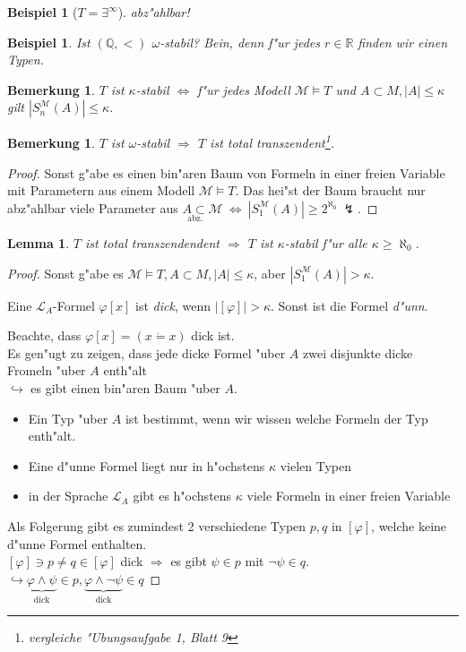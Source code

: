 \documentclass[a4paper,12pt,numbers=noenddot,parskip=full]{scrartcl}
\newcommand{\setQ}{\mathbb{Q}}
\newcommand{\setR}{\mathbb{R}}
\newcommand{\scrL}{\mathcal{L}}
\newcommand{\scrM}{\mathcal{M}}
\theoremstyle{dotless}
\newtheorem{lemma}[theorem]{Lemma}
\newtheorem{example}[theorem]{Beispiel}
\newtheorem{remark}[theorem]{Bemerkung}
\begin{document}
\begin{example}[$T = \exists^\infty$]
	abz"ahlbar!
\end{example}
\begin{example}
	Ist $(\setQ, <)$ $\omega$-stabil? Bein, denn f"ur jedes $r \in \setR$ finden wir einen Typen.
\end{example}
\begin{remark}
	$T$ ist $\kappa$-stabil $\Longleftrightarrow$ f"ur jedes Modell $\scrM \models T$ und $A \subset M, |A| \leq \kappa$ gilt $|S_n^\scrM(A)| \leq \kappa$.
\end{remark}
\begin{remark}
	$T$ ist $\omega$-stabil $\Longrightarrow$ $T$ ist total transzendent\footnote{vergleiche "Ubungsaufgabe 1, Blatt 9}.
\end{remark}
\begin{proof}
	Sonst g"abe es einen bin"aren Baum von Formeln in einer freien Variable mit Parametern aus einem Modell $\scrM \models T$. Das hei"st der Baum braucht nur abz"ahlbar viele Parameter aus $\underset{\text{abz.}}{A \subset} \scrM~ \Leftrightarrow~ |S_1^\scrM (A)| \geq 2^{\aleph_0}~ \lightning$.
\end{proof}
\begin{lemma}
	$T$ ist total transzendendent $\Rightarrow$ $T$ ist $\kappa$-stabil f"ur alle $\kappa \geq \aleph_0$.
\end{lemma}
\begin{proof}
	Sonst g"abe es $\scrM \models T, A\subset M, |A| \leq \kappa$, aber $|S_1^\scrM (A)| > \kappa$.
	
	Eine $\scrL_A$-Formel $\varphi[x]$ ist \emph{dick}, wenn $|[\varphi]| > \kappa$. Sonst ist die Formel \emph{d"unn}.
	
	Beachte, dass $\varphi[x] = (x \dot= x)$ dick ist.\\
	Es gen"ugt zu zeigen, dass jede dicke Formel "uber $A$ zwei disjunkte dicke Fromeln "uber $A$ enth"alt\\
	$\hookrightarrow$ es gibt einen bin"aren Baum "uber $A$.
	\begin{itemize}
		\item Ein Typ "uber $A$ ist bestimmt, wenn wir wissen welche Formeln der Typ enth"alt.
		\item Eine d"unne Formel liegt nur in h"ochstens $\kappa$ vielen Typen
		\item in der Sprache $\scrL_A$ gibt es h"ochstens $\kappa$ viele Formeln in einer freien Variable
	\end{itemize}
	Als Folgerung gibt es zumindest 2 verschiedene Typen $p,q$ in $[\varphi]$, welche keine d"unne Formel enthalten.\\
	$[\varphi] \ni p \neq q \in [\varphi]$ dick $\Rightarrow$ es gibt $\psi \in p$ mit $\lnot \psi \in q$.\\
	$\hookrightarrow \underbrace{\varphi \land \psi}_\text{dick} \in p, \underbrace{\varphi \land \lnot \psi}_\text{dick} \in q$
\end{proof}
\end{document}
